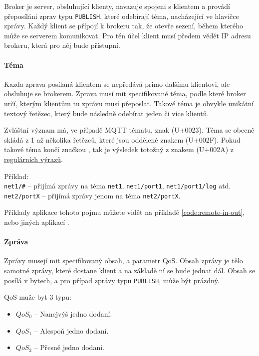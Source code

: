 Broker je server, obsluhující klienty, navazuje spojeni s klientem a provádí přeposíláni zprav typu \texttt{PUBLISH}, které odebírají téma, nacházející ve hlavičce zprávy. Každý klient se přípojí k brokeru tak, že otevře sezení, během kterého může se serverem komunikovat. Pro tén účel klient musí předem vědět IP adresu brokeru, která pro něj bude přístupní.

\paragraph{Téma}
\label{par:topic}

Kazda zprava posílaná klientem se nepředává primo dalšímu klientovi, ale obsluhuje se brokerem. Zprava musí mit specifikované téma, podle které broker určí, kterým klientům tu zprávu musí přeposlat. Takové téma je obvykle unikátní textový řetězec, který bude následně odebírat jeden či více klientů.

Zvláštní význam má, ve případě MQTT tématu, znak \uv{\#} (U+0023). Téma se obecně skládá z 1 až několika řetězců, které jsou oddělené znakem \uv{/} (U+002F). Pokud takové téma končí značkou \uv{\#}, tak je výsledek totožný z  znakem \uv{*} (U+002A) z \href{https://en.wikipedia.org/wiki/Regular_expression}{regulárních výrazů}.

\begin{tabbing}
 Příklad: \= \\
 \> \texttt{net1/\#} -- přijímá zprávy na téma \texttt{net1}, \texttt{net1/port1}, \texttt{net1/port1/log} atd.\\
 \> \texttt{net2/portX} -- přijímá zprávy jenom na téma \texttt{net2/portX}. \\
\end{tabbing}

Příklady aplikace tohoto pojmu můžete vidět na příkladě \ref{code:remote-in-out}, nebo jiných aplikací \todo{}.

\paragraph{Zpráva}
\label{par:message}

Zprávy musejí mit specifikovaný obsah, a parametr QoS. Obsah zprávy je tělo samotné zprávy, které dostane klient a na základě ní se bude jednat dál. Obsah se posílá v bytech, a pro případ zprávy typu \texttt{PUBLISH}, může být prázdný.

QoS muže byt 3 typu:
\begin{itemize}
  \item $QoS_0$ -- Nanejvýš jedno dodaní.
  \item $QoS_1$ -- Alespoň jedno dodaní.
  \item $QoS_2$ -- Přesně jedno dodaní.
\end{itemize}

